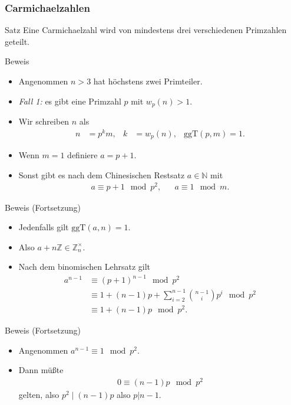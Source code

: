 \documentclass{beamer}
\renewcommand{\emph}[1]{{\textcolor{solarizedRed}{\itshape #1}}}
\newcommand\NN{\mathbb N}
\newcommand\ZZ{\mathbb Z}
\newcommand{\ggt}{\mathrm{ggT}}
\renewcommand{\oe}{\"o}
\newcommand{\ue}{\"u}
\begin{document}
\begin{frame}\frametitle{Carmichaelzahlen}
\begin{block}{Satz}
Eine Carmichaelzahl wird von mindestens drei verschiedenen Primzahlen geteilt.
\end{block}
\begin{overprint}
\begin{block}{Beweis}
\begin{itemize}
\item Angenommen $n>3$ hat h\oe chstens zwei Primteiler.
\item \emph{Fall 1:} es gibt eine Primzahl $p$ mit $w_p(n)>1$.
\item Wir schreiben $n$ als
	\begin{align*}
		n&=p^km,&k&=w_p(n),&\ggt(p,m)=1.
	\end{align*}
\item Wenn $m=1$ definiere $a=p+1$.
\item Sonst gibt es nach dem Chinesischen Restsatz $a\in\NN$ mit
	\begin{align*}
		a\equiv p+1\mod p^2,&&a\equiv 1\mod m.
	\end{align*}
\end{itemize}
\end{block}
\begin{block}{Beweis (Fortsetzung)}
\begin{itemize}
	\item Jedenfalls gilt $\ggt(a,n)=1$.
	\item Also $a+n\ZZ\in\ZZ_n^\times$.
	\item Nach dem binomischen Lehrsatz gilt
		\begin{align*}
			a^{n-1}&\equiv(p+1)^{n-1}\mod p^2\\
				   &\equiv1+(n-1)p+\sum_{i=2}^{n-1}\binom{n-1}ip^i\mod p^2\\
				   &\equiv1+(n-1)p\mod p^2.
		\end{align*}
\end{itemize}
\end{block}
\begin{block}{Beweis (Fortsetzung)}
\begin{itemize}
	\item Angenommen $a^{n-1}\equiv1\mod p^2$.
	\item Dann m\ue\ss te
		\begin{align*}
			0\equiv(n-1)p\mod p^2
		\end{align*}
		gelten, also $p^2\mid(n-1)p$ also $p|n-1$.

\end{itemize}
\end{block}
\end{overprint}
\end{frame}
\end{document}
